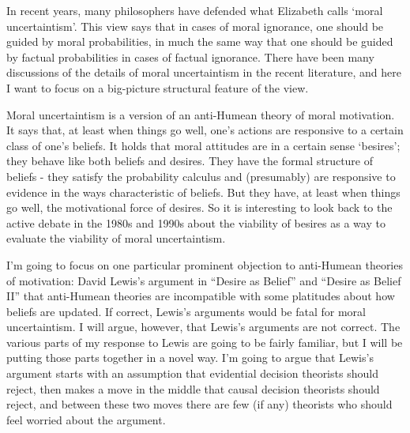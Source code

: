 \def\mytitle{Moral Uncertainty and the Desire as Belief Thesis}
\def\shorttitle{Desire as Belief}
\def\myauthor{Brian Weatherson}
\def\bibliocommand{}


In recent years, many philosophers have defended what Elizabeth \citet{Harman201x} calls `moral uncertaintism'. This view says that in cases of moral ignorance, one should be guided by moral probabilities, in much the same way that one should be guided by factual probabilities in cases of factual ignorance. There have been many discussions of the details of moral uncertaintism in the recent literature, and here I want to focus on a big-picture structural feature of the view.

Moral uncertaintism is a version of an anti-Humean theory of moral motivation. It says that, at least when things go well, one's actions are responsive to a certain class of one's beliefs. It holds that moral attitudes are in a certain sense `besires'; they behave like both beliefs and desires. They have the formal structure of beliefs - they satisfy the probability calculus and (presumably) are responsive to evidence in the ways characteristic of beliefs. But they have, at least when things go well, the motivational force of desires. So it is interesting to look back to the active debate in the 1980s and 1990s about the viability of besires as a way to evaluate the viability of moral uncertaintism.

I'm going to focus on one particular prominent objection to anti-Humean theories of motivation: David Lewis's argument in ``Desire as Belief'' and ``Desire as Belief II'' that anti-Humean theories are incompatible with some platitudes about how beliefs are updated. If correct, Lewis's arguments would be fatal for moral uncertaintism. I will argue, however, that Lewis's arguments are not correct. The various parts of my response to Lewis are going to be fairly familiar, but I will be putting those parts together in a novel way. I'm going to argue that Lewis's argument starts with an assumption that evidential decision theorists should reject, then makes a move in the middle that causal decision theorists should reject, and between these two moves there are few (if any) theorists who should feel worried about the argument.

